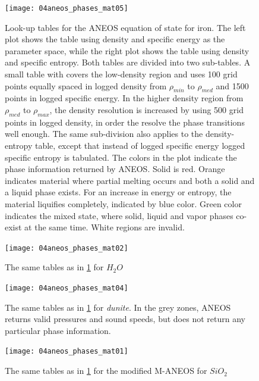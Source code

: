 \begin{figure}
\begin{center}
\texttt{[image: 04aneos\_phases\_mat05]}
\caption{Look-up tables for the ANEOS equation of state for iron. The left plot shows the table using density and specific energy as the parameter space, while the right plot shows the table using density and specific entropy. Both tables are divided into two sub-tables. A small table with covers the low-density region and uses 100 grid points equally spaced in logged density from $\rho_{min}$ to $\rho_{med}$ and 1500 points in logged specific energy. In the higher density region from $\rho_{med}$ to $\rho_{max}$, the density resolution is increased by using 500 grid points in logged density, in order the resolve the phase transitions well enough. The same sub-division also applies to the density-entropy table, except that instead of logged specific energy logged specific entropy is tabulated. The colors in the plot indicate the phase information returned by ANEOS. Solid is red. Orange indicates material where partial melting occurs and both a solid and a liquid phase exists. For an increase in energy or entropy, the material liquifies completely, indicated by blue color. Green color indicates the mixed state, where solid, liquid and vapor phases co-exist at the same time. White regions are invalid.}
\label{ch02_fig04a}
\end{center}
\end{figure}

\begin{figure}
\begin{center}
\texttt{[image: 04aneos\_phases\_mat02]}
\caption{The same tables as in \ref{ch02_fig04a} for $H_2 O$ }
\label{ch02_fig04b}
\end{center}
\end{figure}

\begin{figure}
\begin{center}
\texttt{[image: 04aneos\_phases\_mat04]}
\caption{The same tables as in \ref{ch02_fig04a} for \emph{dunite}. In the grey zones, ANEOS returns valid pressures and sound speeds, but does not return any particular phase information.}
\label{ch02_fig04c}
\end{center}
\end{figure}

\begin{figure}
\begin{center}
\texttt{[image: 04aneos\_phases\_mat01]}
\caption{The same tables as in \ref{ch02_fig04a} for the modified M-ANEOS for $SiO_2$}
\label{ch02_fig04d}
\end{center}
\end{figure}


